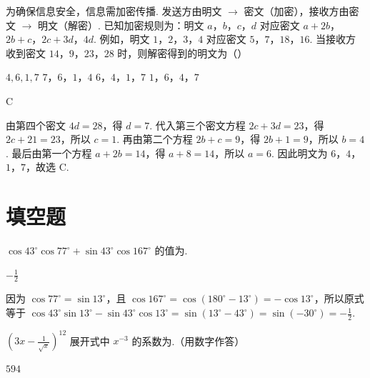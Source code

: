 \begin{problem}
为确保信息安全，信息需加密传播. 发送方由明文 \(\rightarrow\) 密文（加密），接收方由密文 \(\rightarrow\) 明文（解密）. 已知加密规则为：明文 \(a\)，\(b\)，\(c\)，\(d\) 对应密文 \(a + 2b\)，\(2b + c\)，\(2c + 3d\)，\(4d\). 例如，明文 \(1\)，\(2\)，\(3\)，\(4\) 对应密文 \(5\)，\(7\)，\(18\)，\(16\). 当接收方收到密文 \(14\)，\(9\)，\(23\)，\(28\) 时，则解密得到的明文为（\quad）

\choices
    {\(4,6,1,7\)}
    {\(7\)，\(6\)，\(1\)，\(4\)}
    {\(6\)，\(4\)，\(1\)，\(7\)}
    {\(1\)，\(6\)，\(4\)，\(7\)}
\end{problem}

\begin{answer}
C
\end{answer}

\begin{solution}
由第四个密文 \(4d=28\)，得 \(d=7\). 代入第三个密文方程 \(2c+3d=23\)，得 \(2c+21=23\)，所以 \(c=1\). 再由第二个方程 \(2b+c=9\)，得 \(2b+1=9\)，所以 \(b=4\). 最后由第一个方程 \(a+2b=14\)，得 \(a+8=14\)，所以 \(a=6\). 因此明文为 \(6\)，\(4\)，\(1\)，\(7\)，故选 C.
\end{solution}

\section{填空题}
\begin{problem}
\(\cos 43^{\circ} \cos 77^{\circ} + \sin 43^{\circ} \cos 167^{\circ}\) 的值为\fillinblank{}.
\end{problem}

\begin{answer}
\(-\frac{1}{2}\)
\end{answer}

\begin{solution}
因为 \(\cos77^{\circ}=\sin13^{\circ}\)，且 \(\cos167^{\circ}=\cos(180^{\circ}-13^{\circ})=-\cos13^{\circ}\)，所以原式等于 \(\cos43^{\circ}\sin13^{\circ}-\sin43^{\circ}\cos13^{\circ}=\sin(13^{\circ}-43^{\circ})=\sin(-30^{\circ})=-\frac12\).
\end{solution}

\begin{problem}
\(\left(3x - \frac{1}{\sqrt{x}}\right)^{12}\) 展开式中 \(x^{-3}\) 的系数为\fillinblank{}.（用数字作答）
\end{problem}

\begin{answer}
\(594\)
\end{answer}

